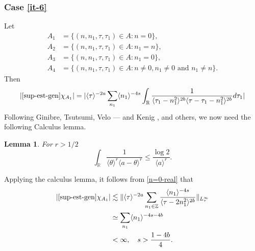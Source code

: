 \documentclass[12pt,reqno]{amsart}
\numberwithin{equation}{section}  %
\numberwithin{figure}{section}
\newcommand{\rr}{\mathbb{R}}
\newcommand{\zz}{\mathbb{Z}}
\theoremstyle{plain}
\newtheorem{lemma}{Lemma}
\theoremstyle{definition}
\theoremstyle{remark}
\newtheorem{remark}{Remark}
\begin{document}
 \subsubsection{Case \eqref{it-6}} 
\label{sssec:case-it-6}
Let 
%
%
\begin{align*}
A_1&=\{(n, n_1, \tau, \tau_1)\in A: n=0\},\\
A_2&=\{(n, n_1, \tau, \tau_1)\in A: n_1 = n \},\\
A_3&=\{(n, n_1, \tau, \tau_1)\in A: n_1=0 \},\\
A_4&=\{(n, n_1, \tau, \tau_1)\in A: n \neq 0, n_1 \neq 0 \text{ and } n_1 \neq n \}.
\end{align*} 
%
%
Then 
%
%
\begin{equation}
  \label{n=0-real}
\begin{split}
  |  \eqref{sup-est-gen} \chi_{A_{1}}| = | \langle \tau \rangle ^{-2a} \sum_{n_{1}} \langle
  n_{1}\rangle ^{-4s} \int_{\rr} \frac{1}{\langle \tau_{1} - n_{1}^{2} \rangle ^{2b}\langle
  \tau - \tau_{1} - n_{1}^{2}\rangle ^{2b}}d \tau_{1} |
\end{split}
\end{equation}
%
%
Following Ginibre, Tsutsumi, Velo --- and Kenig \cite{Kenig:1996aa}, and others,
we now need the following Calculus lemma.
%
%
%
%
%
%
%
%
\begin{lemma}
	\label{lem:calc}
 For $r > 1/2$
\begin{equation*}
  \int_{\rr} \frac{1} {\langle  \theta \rangle^{r} \langle  a - \theta
  \rangle^{r}}\leq\frac{\log 2} {\langle a \rangle^{r}}.
\end{equation*}
 \end{lemma}
%
%
%
%
%

Applying the calculus lemma, it follows from \eqref{n=0-real} that
%
\begin{equation*}
\begin{split}
  |\eqref{sup-est-gen} \chi_{A_{1}} |  & \lesssim \| \langle \tau \rangle ^{-2a} \sum_{n_{1} \in \zz} \frac{\langle n_{1} \rangle
  ^{-4s}}{ \langle \tau - 2n_{1}^{2}  \rangle ^{2b}} \|_{L^{\infty}_{\tau}}
  \\
  & \simeq \sum_{n_{1}} \langle n_{1} \rangle ^{-4s - 4b}
  \\
  & < \infty, \quad s > \frac{1-4b}{4}.
\end{split}
\end{equation*}
%
%
%
%
\end{document}
